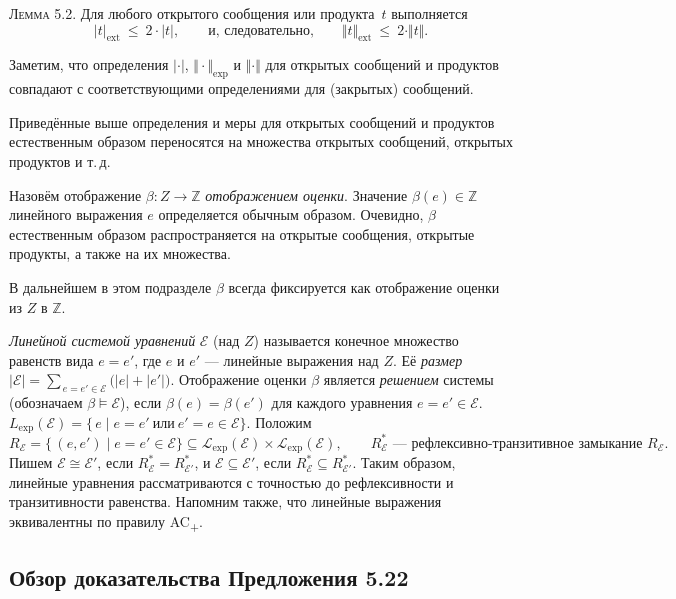 \medskip
\textsc{Лемма 5.2.}
Для любого открытого сообщения или продукта~$t$ выполняется
\[
  |t|_{\text{ext}}\ \le\ 2\cdot |t|,
  \qquad\text{и, следовательно,}\qquad
  \Vert t\Vert_{\text{ext}}\ \le\ 2\cdot\Vert t\Vert.
\]

Заметим, что определения $|\cdot|$, $\Vert\cdot\Vert_{\text{exp}}$ и $\Vert\cdot\Vert$
для открытых сообщений и продуктов совпадают с соответствующими
определениями для (закрытых) сообщений.

Приведённые выше определения и меры для открытых сообщений и продуктов
естественным образом переносятся на множества открытых сообщений,
открытых продуктов и т.\,д.

Назовём отображение $\beta : Z \to \mathbb Z$ \emph{отображением оценки}.
Значение $\beta(e)\in\mathbb Z$ линейного выражения $e$
определяется обычным образом.
Очевидно, $\beta$ естественным образом распространяется
на открытые сообщения, открытые продукты,
а также на их множества.

В дальнейшем в этом подразделе
$\beta$ всегда фиксируется как отображение оценки из $Z$ в $\mathbb Z$.

\medskip
\emph{Линейной системой уравнений} $\mathcal E$ (над $Z$) называется
конечное множество равенств вида $e = e'$, где
$e$ и $e'$ — линейные выражения над $Z$.
Её \emph{размер}
\(
  \lvert\mathcal E\rvert
  = \sum_{\,e=e'\in\mathcal E}\bigl(\lvert e\rvert+\lvert e'\rvert\bigr).
\)
Отображение оценки $\beta$ является \emph{решением} системы
(обозначаем $\beta\models\mathcal E$),
если $\beta(e)=\beta(e')$ для каждого уравнения $e=e'\in\mathcal E$.
\(
  L_{\text{exp}}(\mathcal E)=
  \bigl\{\,e \mid e=e'\ \text{или}\ e'=e\in\mathcal E\bigr\}.
\)
Положим
\(
  R_{\mathcal E} =
  \bigl\{\, (e,e') \mid e=e' \in \mathcal E \bigr\}
  \subseteq \mathcal L_{\text{exp}}(\mathcal E)\times \mathcal L_{\text{exp}}(\mathcal E),
  \qquad
  R_{\mathcal E}^{*}\text{ — рефлексивно-транзитивное замыкание }R_{\mathcal E}.
\)
Пишем $\mathcal E \cong \mathcal E'$, если
$R_{\mathcal E}^{*}=R_{\mathcal E'}^{*}$,
и $\mathcal E\subseteq\mathcal E'$, если
$R_{\mathcal E}^{*}\subseteq R_{\mathcal E'}^{*}$.
Таким образом, линейные уравнения рассматриваются
с точностью до рефлексивности и транзитивности равенства.
Напомним также, что линейные выражения эквивалентны по правилу AC\textsubscript{+}.

\subsection{Обзор доказательства Предложения 5.22}

